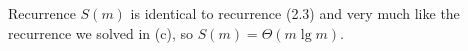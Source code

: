 Recurrence $S(m)$ is identical to recurrence (2.3) and very much like the recurrence we solved in (c), so $S(m)=\Theta(m\lg m)$.
